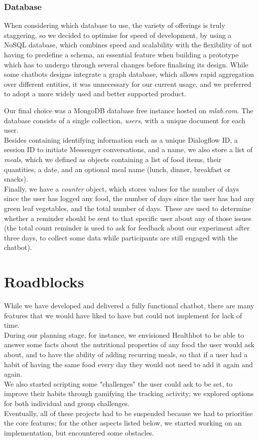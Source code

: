 \subsubsection{Database}
When considering which database to use, the variety of offerings is truly staggering, so we decided to optimise for speed of development, by using a NoSQL database, which combines speed and scalability with the flexibility of not having to predefine a schema, an essential feature when building a prototype which has to undergo through several changes before finalising its design. While some chatbots designs integrate a graph database, which allows rapid aggregation over different entities, it was unnecessary for our current usage, and we preferred to adopt a more widely used and better supported product.

Our final choice was a MongoDB database free instance hosted on \textit{mlab.com}. The database consists of a single collection, \textit{users}, with a unique document for each user. \\
Besides containing identifying information such as a unique Dialogflow ID, a session ID to initiate Messenger conversations, and a name, we also store a list of \textit{meals}, which we defined as objects containing a list of food items, their quantities, a date, and an optional meal name (lunch, dinner, breakfast or snacks). \\
Finally, we have a \textit{counter} object, which stores values for the number of days since the user has logged any food, the number of days since the user has had any green leaf vegetables, and the total number of days. These are used to determine whether a reminder should be sent to that specific user about any of those issues (the total count reminder is used to ask for feedback about our experiment after three days, to collect some data while participants are still engaged with the chatbot).
\section{Roadblocks}
While we have developed and delivered a fully functional chatbot, there are many features that we would have liked to have but could not implement for lack of time. \\
During our planning stage, for instance, we envisioned Healthbot to be able to answer some facts about the nutritional properties of any food the user would ask about, and to have the ability of adding recurring meals, so that if a user had a habit of having the same food every day they would not need to add it again and again. \\
We also started scripting some "challenges" the user could ask to be set, to improve their habits through gamifying the tracking activity; we explored options for both individual and group challenges.\\
Eventually, all of these projects had to be suspended because we had to prioritise the core features; for the other aspects listed below, we started working on an implementation, but encountered some obstacles.
